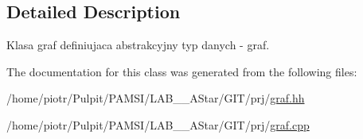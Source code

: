 \subsection{\-Detailed \-Description}
\-Klasa graf definiujaca abstrakcyjny typ danych -\/ graf. 

\-The documentation for this class was generated from the following files\-:\begin{DoxyCompactItemize}
\item 
/home/piotr/\-Pulpit/\-P\-A\-M\-S\-I/\-L\-A\-B\-\_\-\_\-\-A\-Star/\-G\-I\-T/prj/\hyperlink{graf_8hh}{graf.\-hh}\item 
/home/piotr/\-Pulpit/\-P\-A\-M\-S\-I/\-L\-A\-B\-\_\-\_\-\-A\-Star/\-G\-I\-T/prj/\hyperlink{graf_8cpp}{graf.\-cpp}\end{DoxyCompactItemize}
